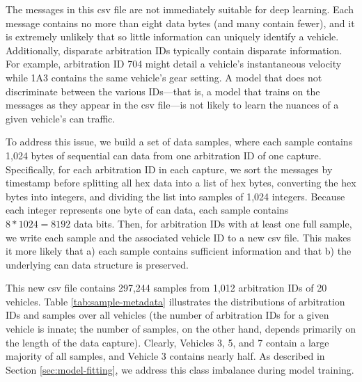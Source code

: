 \documentclass[../main.tex]{subfiles}
\begin{document}
The messages in this \ac{csv} file are not immediately suitable for deep learning. Each message contains no more than eight data bytes (and many contain fewer), and it is extremely unlikely that so little information can uniquely identify a vehicle. Additionally, disparate arbitration IDs typically contain disparate information. For example, arbitration ID 704 might detail a vehicle's instantaneous velocity while 1A3 contains the same vehicle's gear setting. A model that does not discriminate between the various IDs---that is, a model that trains on the messages as they appear in the \ac{csv} file---is not likely to learn the nuances of a given vehicle's \ac{can} traffic.

To address this issue, we build a set of data samples, where each sample contains 1,024 bytes of sequential \ac{can} data from one arbitration ID of one capture. Specifically, for each arbitration ID in each capture, we sort the messages by timestamp before splitting all hex data into a list of hex bytes, converting the hex bytes into integers, and dividing the list into samples of 1,024 integers. Because each integer represents one byte of \ac{can} data, each sample contains $8*1024=8192$ data bits. Then, for arbitration IDs with at least one full sample\footnotemark[2], we write each sample and the associated vehicle ID to a new \ac{csv} file. This makes it more likely that a) each sample contains sufficient information and that b) the underlying \ac{can} data structure is preserved.



This new \ac{csv} file contains 297,244 samples from 1,012 arbitration IDs of 20 vehicles. Table \ref{tab:sample-metadata} illustrates the distributions of arbitration IDs and samples over all vehicles (the number of arbitration IDs for a given vehicle is innate; the number of samples, on the other hand, depends primarily on the length of the data capture). Clearly, Vehicles 3, 5, and 7 contain a large majority of all samples, and Vehicle 3 contains nearly half. As described in Section \ref{sec:model-fitting}, we address this class imbalance during model training.
\end{document}
